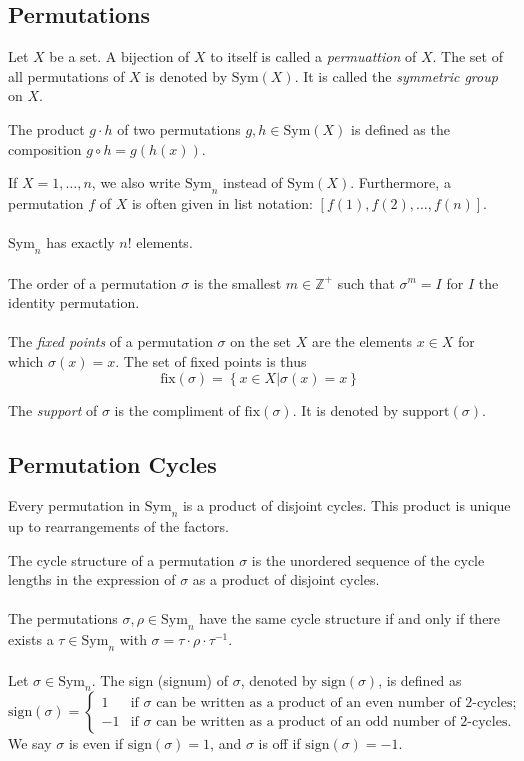 \documentclass[fleqn]{article}
\begin{document}
\subsection{Permutations}
Let $X$ be a set.
A bijection of $X$ to itself is called a \textit{permuattion} of $X$. The set of
all permutations of $X$ is denoted by $\text{Sym}(X)$. It is called the \textit{symmetric group}
on $X$.

The product $g \cdot h$ of two permutations $g,h \in \text{Sym}(X)$ is defined as
the composition $g \circ h = g(h(x))$.

If $X = {1, \dots, n}$, we also write $\text{Sym}_n$ instead of $\text{Sym}(X)$.
Furthermore, a permutation $f$ of $X$ is often given in list notation:
$[f(1), f(2), \dots, f(n)]$.\\
\\
$\text{Sym}_n$ has exactly $n!$ elements.\\
\\
The order of a permutation $\sigma$ is the smallest $m \in \mathbb{Z}^+$ such that
$\sigma^m = I$ for $I$ the identity permutation.\\
\\
The \textit{fixed points} of a permutation $\sigma$ on the set $X$ are the elements
$x \in X$ for which $\sigma(x) = x$. The set of fixed points is thus
\begin{equation*}
    \text{fix}(\sigma) = \left\{ x \in X | \sigma(x) = x \right\}
\end{equation*}

The \textit{support} of $\sigma$ is the compliment of $\text{fix}(\sigma)$. It is
denoted by $\text{support}(\sigma)$.

\subsection{Permutation Cycles}
Every permutation in $\text{Sym}_n$ is a product of disjoint cycles. This product
is unique up to rearrangements of the factors.

The cycle structure of a permutation $\sigma$ is the unordered sequence of the cycle lengths
in the expression of $\sigma$ as a product of disjoint cycles.\\
\\
The permutations $\sigma, \rho \in \text{Sym}_n$ have the same cycle structure if
and only if there exists a $\tau \in \text{Sym}_n$ with $\sigma = \tau \cdot \rho \cdot \tau^{-1}$.\\
\\
Let $\sigma \in \text{Sym}_n$. The sign (signum) of $\sigma$, denoted by $\text{sign}(\sigma)$,
is defined as
\begin{equation*}
    \text{sign}(\sigma)= \begin{cases}
        1 & \text{if $\sigma$ can be written as a product of an even number of 2-cycles}; \\
        -1 & \text{if $\sigma$ can be written as a product of an odd number of 2-cycles}.
    \end{cases}
\end{equation*}
We say $\sigma$ is even if $\text{sign}(\sigma) = 1$, and $\sigma$ is off if $\text{sign}(\sigma) = -1$.
\end{document}
